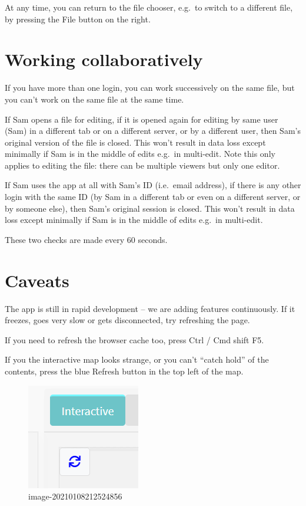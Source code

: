 \documentclass[
]{book}
\begin{document}
At any time, you can return to the file chooser, e.g.~to switch to a different file, by pressing the File button on the right.

\hypertarget{working-collaboratively}{%
\section{Working collaboratively}\label{working-collaboratively}}

If you have more than one login, you can work successively on the same file, but you can't work on the same file at the same time.

If Sam opens a file for editing, if it is opened again for editing by same user (Sam) in a different tab or on a different server, or by a different user, then Sam's original version of the file is closed. This won't result in data loss except minimally if Sam is in the middle of edits e.g.~in multi-edit.
Note this only applies to editing the file: there can be multiple viewers but only one editor.

If Sam uses the app at all with Sam's ID (i.e.~email address), if there is any other login with the same ID (by Sam in a different tab or even on a different server, or by someone else), then Sam's original session is closed. This won't result in data loss except minimally if Sam is in the middle of edits e.g.~in multi-edit.

These two checks are made every 60 seconds.

\hypertarget{caveats}{%
\section{Caveats}\label{caveats}}

The app is still in rapid development -- we are adding features continuously. If it freezes, goes very slow or gets disconnected, try refreshing the page.

If you need to refresh the browser cache too, press Ctrl / Cmd shift F5.

If you the interactive map looks strange, or you can't ``catch hold'' of the contents, press the blue Refresh button in the top left of the map.

\begin{figure}
\centering
\includegraphics{_assets/image-20210108212524856.png}
\caption{image-20210108212524856}
\end{figure}
\end{document}
